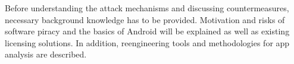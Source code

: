 Before understanding the attack mechanisms and discussing countermeasures, necessary background knowledge has to be provided.
Motivation and risks of software piracy and the basics of Android will be explained as well as existing licensing solutions.
In addition, reengineering tools and methodologies for app analysis are described.
